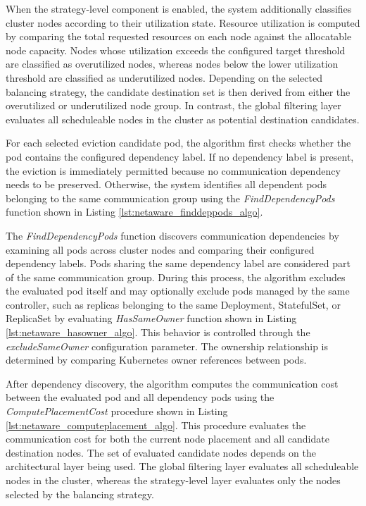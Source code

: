 When the strategy-level component is enabled, the system additionally classifies cluster nodes according to their utilization state. Resource utilization is computed by comparing the total requested resources on each node against the allocatable node capacity. Nodes whose utilization exceeds the configured target threshold are classified as overutilized nodes, whereas nodes below the lower utilization threshold are classified as underutilized nodes. Depending on the selected balancing strategy, the candidate destination set is then derived from either the overutilized or underutilized node group. In contrast, the global filtering layer evaluates all scheduleable nodes in the cluster as potential destination candidates.

For each selected eviction candidate pod, the algorithm first checks whether the pod contains the configured dependency label. If no dependency label is present, the eviction is immediately permitted because no communication dependency needs to be preserved. Otherwise, the system identifies all dependent pods belonging to the same communication group using the \textit{FindDependencyPods} function shown in Listing \ref{lst:netaware_finddeppods_algo}.




The \textit{FindDependencyPods} function discovers communication dependencies by examining all pods across cluster nodes and comparing their configured dependency labels. Pods sharing the same dependency label are considered part of the same communication group. During this process, the algorithm excludes the evaluated pod itself and may optionally exclude pods managed by the same controller, such as replicas belonging to the same Deployment, StatefulSet, or ReplicaSet by evaluating \textit{HasSameOwner} function shown in Listing \ref{lst:netaware_hasowner_algo}. This behavior is controlled through the \textit{excludeSameOwner} configuration parameter. The ownership relationship is determined by comparing Kubernetes owner references between pods.

After dependency discovery, the algorithm computes the communication cost between the evaluated pod and all dependency pods using the \textit{ComputePlacementCost} procedure shown in Listing \ref{lst:netaware_computeplacement_algo}. This procedure evaluates the communication cost for both the current node placement and all candidate destination nodes. The set of evaluated candidate nodes depends on the architectural layer being used. The global filtering layer evaluates all scheduleable nodes in the cluster, whereas the strategy-level layer evaluates only the nodes selected by the balancing strategy.

